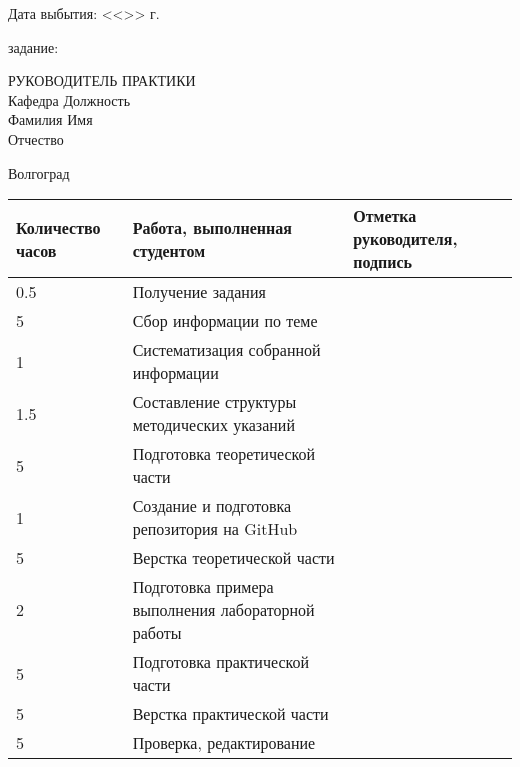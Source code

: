 \documentclass[a4paper, 14pt]{extreport}
\begin{document}
\begin{titlepage}
\begin{flushleft}
            Дата выбытия: \hspace{3cm}<<\underline{\hspace{1cm}}>> \underline{\hspace{3cm}} \the\year г.
        \end{flushleft}
        \vspace{1cm}
         задание: \underline{\hspace{10.7cm}}\\
        \underline{\hspace{16.5cm}}
        \vspace{1cm}
        \begin{flushleft}
            РУКОВОДИТЕЛЬ ПРАКТИКИ\\
            Кафедра \underline{\hspace{5cm}} Должность \underline{\hspace{5cm}} \\
            Фамилия \underline{\hspace{4.9cm}} Имя \underline{\hspace{6.5cm}}\\
            Отчество \underline{\hspace{4.9cm}}
        \end{flushleft}
        \vspace{\fill}
        \begin{center}
            Волгоград \the\year
        \end{center}
    \end{titlepage}
    \begin{table}[h!]
        \centering
        \begin{tabular}{|m{}|m{}|m{}|}
            \hline 
            Количество часов & Работа, выполненная студентом & Отметка
              руководителя, подпись \\ \hline
            0.5 & Получение задания & \\ \hline
              5 & Сбор информации по теме & \\ \hline
              1 & Систематизация собранной информации & \\ \hline
            1.5 & Составление структуры методических указаний & \\ \hline
              5 & Подготовка теоретической части & \\ \hline
              1 & Создание и подготовка репозитория на GitHub & \\ \hline
              5 & Верстка теоретической части & \\ \hline
              2 & Подготовка примера выполнения лабораторной работы & \\ \hline
              5 & Подготовка практической части & \\ \hline
              5 & Верстка практической части & \\ \hline
              5 & Проверка, редактирование & \\ \hline
        \end{tabular}
    \end{table}
\end{document}
